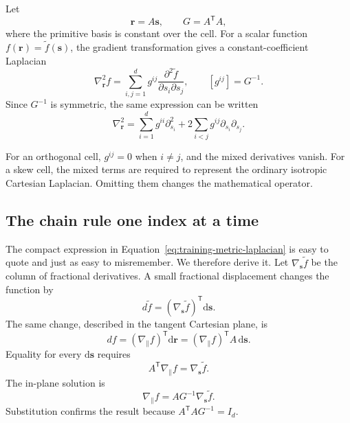 Let
\begin{equation}
  \mathbf r=A\mathbf s,
  \qquad
  G=A^{\mathsf T}A,
  \label{eq:training-fd-coordinate-map}
\end{equation}
where the primitive basis is constant over the cell. For a scalar function
$f(\mathbf r)=\widetilde f(\mathbf s)$, the gradient transformation gives a
constant-coefficient Laplacian
\begin{equation}
  \nabla_{\mathbf r}^2 f
  =
  \sum_{i,j=1}^{d}
  g^{ij}
  \frac{\partial^2\widetilde f}
       {\partial s_i\partial s_j},
  \qquad
  [g^{ij}]=G^{-1}.
  \label{eq:training-metric-laplacian}
\end{equation}
Since $G^{-1}$ is symmetric, the same expression can be written
\begin{equation}
  \nabla_{\mathbf r}^2
  =
  \sum_{i=1}^{d}g^{ii}\partial_{s_i}^2
  +2\sum_{i<j}g^{ij}\partial_{s_i}\partial_{s_j}.
  \label{eq:training-metric-laplacian-symmetric}
\end{equation}

For an orthogonal cell, $g^{ij}=0$ when $i\neq j$, and the mixed derivatives
vanish. For a skew cell, the mixed terms are required to represent the ordinary
isotropic Cartesian Laplacian. Omitting them changes the mathematical
operator.

\subsection{The chain rule one index at a time}

The compact expression in Equation~\eqref{eq:training-metric-laplacian} is easy
to quote and just as easy to misremember. We therefore derive it. Let
$\nabla_{\mathbf s}\widetilde f$ be the column of fractional derivatives. A
small fractional displacement changes the function by
\begin{equation}
  d\widetilde f
  =\left(\nabla_{\mathbf s}\widetilde f\right)^{\mathsf T}
   \mathrm{d}\mathbf s.
\end{equation}
The same change, described in the tangent Cartesian plane, is
\begin{equation}
  df
  =\left(\nabla_{\parallel}f\right)^{\mathsf T}\mathrm{d}\mathbf r
  =\left(\nabla_{\parallel}f\right)^{\mathsf T}A\,\mathrm{d}\mathbf s.
\end{equation}
Equality for every $\mathrm{d}\mathbf s$ requires
\begin{equation}
  A^{\mathsf T}\nabla_{\parallel}f
  =\nabla_{\mathbf s}\widetilde f.
  \label{eq:training-gradient-pullback}
\end{equation}
The in-plane solution is
\begin{equation}
  \nabla_{\parallel}f
  =AG^{-1}\nabla_{\mathbf s}\widetilde f.
  \label{eq:training-gradient-pushforward}
\end{equation}
Substitution confirms the result because
$A^{\mathsf T}AG^{-1}=I_d$.

